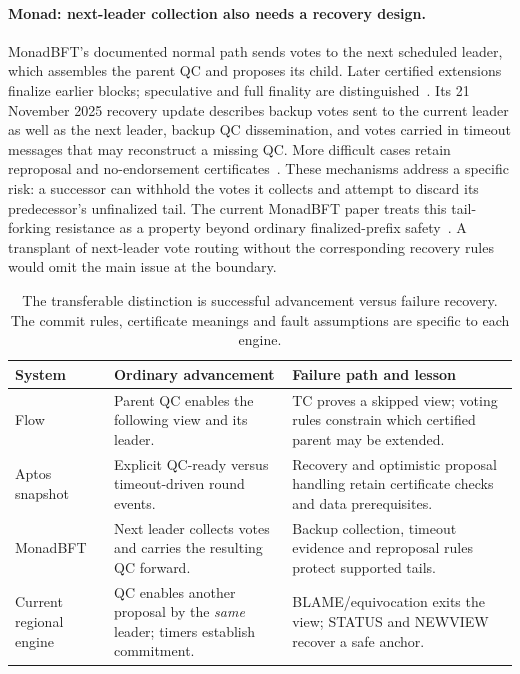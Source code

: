 \paragraph{Monad: next-leader collection also needs a recovery design.}
MonadBFT's documented normal path sends votes to the next scheduled leader,
which assembles the parent QC and proposes its child. Later certified
extensions finalize earlier blocks; speculative and full finality are
distinguished~\cite{monaddocs}. Its 21 November 2025 recovery update describes
backup votes sent to the current leader as well as the next leader, backup
QC dissemination, and votes carried in timeout messages that may reconstruct
a missing QC. More difficult cases retain reproposal and no-endorsement
certificates~\cite{monadrecovery}. These mechanisms address a specific risk:
a successor can withhold the votes it collects and attempt to discard its
predecessor's unfinalized tail. The current MonadBFT paper treats this
tail-forking resistance as a property beyond ordinary finalized-prefix
safety~\cite{monadpaper}. A transplant of next-leader vote routing without
the corresponding recovery rules would omit the main issue at the boundary.

\begin{table}[htbp]\centering\small
\begin{tabularx}{\linewidth}{@{}>{\raggedright\arraybackslash}p{.17\linewidth}Y Y@{}}\toprule
System & Ordinary advancement & Failure path and lesson\\\midrule
Flow & Parent QC enables the following view and its leader. & TC proves a skipped
view; voting rules constrain which certified parent may be extended.\\
Aptos snapshot & Explicit QC-ready versus timeout-driven round events. & Recovery
and optimistic proposal handling retain certificate checks and data prerequisites.\\
MonadBFT & Next leader collects votes and carries the resulting QC forward. &
Backup collection, timeout evidence and reproposal rules protect supported tails.\\
Current regional engine & QC enables another proposal by the \emph{same}
leader; timers establish commitment. & BLAME/equivocation exits the view;
STATUS and NEWVIEW recover a safe anchor.\\\bottomrule
\end{tabularx}
\caption{The transferable distinction is successful advancement versus failure
recovery. The commit rules, certificate meanings and fault assumptions are
specific to each engine.}
\label{tab:real-world-rotation}
\end{table}

